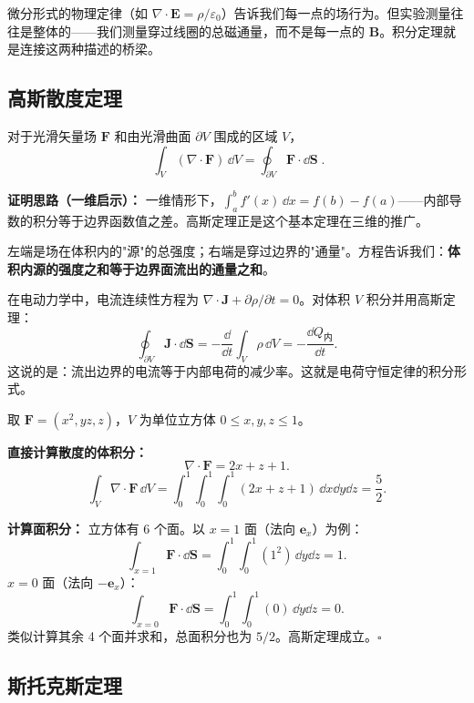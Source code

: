 微分形式的物理定律（如 $\nabla\cdot\mathbf{E}=\rho/\varepsilon_0$）告诉我们每一点的场行为。但实验测量往往是整体的——我们测量穿过线圈的总磁通量，而不是每一点的 $\mathbf{B}$。积分定理就是连接这两种描述的桥梁。

\subsection{高斯散度定理}

\begin{theorem}[高斯定理]
对于光滑矢量场 $\mathbf{F}$ 和由光滑曲面 $\partial V$ 围成的区域 $V$，
\[
\boxed{\;\int_V (\nabla\cdot\mathbf{F})\,\dd V = \oint_{\partial V} \mathbf{F}\cdot\dd\mathbf{S}\;}.
\label{eq:gauss_div}
\]

\textbf{证明思路（一维启示）：} 一维情形下，$\int_a^b f'(x)\,\dd x = f(b)-f(a)$——内部导数的积分等于边界函数值之差。高斯定理正是这个基本定理在三维的推广。

左端是场在体积内的"源"的总强度；右端是穿过边界的"通量"。方程告诉我们：\textbf{体积内源的强度之和等于边界面流出的通量之和}。
\end{theorem}

\begin{insight}[高斯定理与电荷守恒]
在电动力学中，电流连续性方程为 $\nabla\cdot\mathbf{J} + \partial\rho/\partial t = 0$。对体积 $V$ 积分并用高斯定理：
\[
\oint_{\partial V}\mathbf{J}\cdot\dd\mathbf{S} = -\frac{\dd}{\dd t}\int_V\rho\,\dd V = -\frac{\dd Q_{\text{内}}}{\dd t}.
\]
这说的是：流出边界的电流等于内部电荷的减少率。这就是电荷守恒定律的积分形式。
\end{insight}

\begin{example}
取 $\mathbf{F} = (x^2, yz, z)$，$V$ 为单位立方体 $0\leq x,y,z\leq 1$。

\textbf{直接计算散度的体积分：}
\[
\nabla\cdot\mathbf{F} = 2x + z + 1.
\]
\[
\int_V \nabla\cdot\mathbf{F}\,\dd V = \int_0^1\int_0^1\int_0^1 (2x+z+1)\,\dd x\dd y\dd z = \frac52.
\]

\textbf{计算面积分：} 立方体有 6 个面。以 $x=1$ 面（法向 $\mathbf{e}_x$）为例：
\[
\int_{x=1} \mathbf{F}\cdot\dd\mathbf{S} = \int_0^1\int_0^1 (1^2)\,\dd y\dd z = 1.
\]
$x=0$ 面（法向 $-\mathbf{e}_x$）：
\[
\int_{x=0} \mathbf{F}\cdot\dd\mathbf{S} = \int_0^1\int_0^1 (0)\,\dd y\dd z = 0.
\]
类似计算其余 4 个面并求和，总面积分也为 $5/2$。高斯定理成立。$\square$
\end{example}

\subsection{斯托克斯定理}

